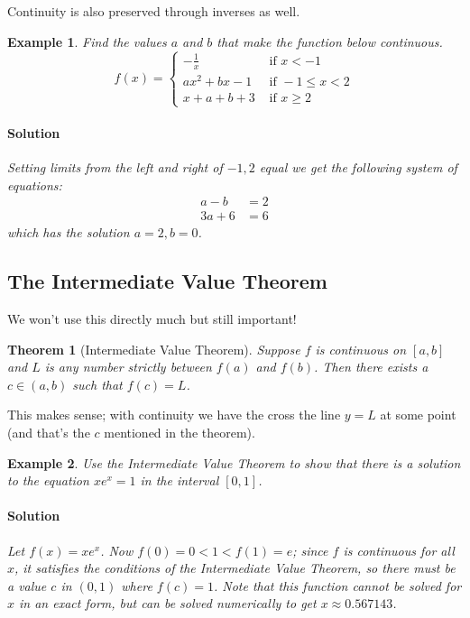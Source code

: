 \documentclass[letterpaper, 11pt, openany]{book}
\theoremstyle{mytheoremstyle}
\newtheorem{theorem}{Theorem}[section]
\theoremstyle{myexamplestyle}
\newtheorem{example}{Example}[section]
\newenvironment{solution}{\paragraph{\sffamily \smaller \fontseries{b}\selectfont Solution}}{\hfill\faSquare}
\begin{document}
Continuity is also preserved through inverses as well.

\begin{example}
    Find the values \(a\) and \(b\) that make the function below continuous.
    \[f(x)= \begin{cases}
        -\frac{1}{x} &\text{ if } x < -1\\
        a x^2 + bx - 1 &\text{ if } -1 \leq x < 2\\
        x + a + b + 3 &\text{ if } x \geq 2
    \end{cases}\]
    \begin{solution}
        Setting limits from the left and right of \(-1, 2\) equal we get the following system of equations:
        \begin{align*}
            a - b &= 2\\
            3a + 6 &= 6
        \end{align*}
        which has the solution \(a=2, b=0\).
    \end{solution}
\end{example}

\subsection{The Intermediate Value Theorem}
We won't use this directly much but still important!
\begin{theorem}[Intermediate Value Theorem]\label{t:int-val-thm}
    Suppose \(f\) is continuous on \([a,b]\) and \(L\) is any number strictly between \(f(a)\) and \(f(b)\). Then there exists a \(c \in (a,b)\) such that \(f(c) = L\).
\end{theorem}
This makes sense; with continuity we have the cross the line \(y = L\) at some point (and that's the \(c\) mentioned in the theorem).

\begin{example}
    Use the Intermediate Value Theorem to show that there is a solution to the equation \(x e^x = 1\) in the interval \(\left[0, 1\right]\).
    \begin{solution}
        Let \(f(x) = x e^x\). Now \(f(0) = 0 < 1 < f(1) = e\); since \(f\) is continuous for all \(x\), it satisfies the conditions of the Intermediate Value Theorem, so there must be a value \(c\) in \((0,1)\) where \(f(c) = 1\). Note that this function cannot be solved for \(x\) in an exact form, but can be solved numerically to get \(x \approx 0.567143\).
    \end{solution}
\end{example}
\end{document}
